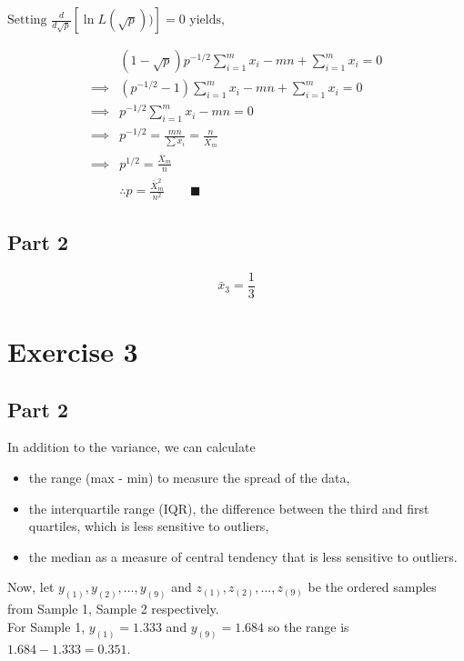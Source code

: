 \documentclass{article}
\begin{document}
$\text{Setting } \frac{d}{d\sqrt{ p }}[\ln{L(\sqrt{ p })})]  = 0 \text{ yields,}$

$$
\begin{aligned}
&(1-\sqrt{ p })p^{-1/2} \sum_{i=1}^m x_{i} - mn + \sum_{i=1}^m x_{i} = 0 \\
\implies &(p^{-1/2} - 1) \sum_{i=1}^m x_{i} - mn + \sum_{i=1}^m x_{i} = 0 \\
\implies &p^{-1/2} \sum_{i=1}^m x_{i} - mn = 0 \\
\implies &p^{-1/2} = \frac{mn}{\sum x_{i}} = \frac{n}{\bar{X}_{m}} \\
\implies &p^{1/2} = \frac{\bar{X}_{m}}{n} \\
& \therefore p = \frac{\bar{X}_{m}^2}{n^2} \qquad \blacksquare
\end{aligned}
$$

\subsection*{Part 2}
$$
\bar{x}_{3} = \frac{1}{3} 
$$

\newpage
\section*{Exercise 3}

\subsection*{Part 2}

In addition to the variance, we can calculate
\begin{itemize}
    \item the range (max - min) to measure the spread of the data,
    \item the interquartile range (IQR), the difference between the third and first quartiles, which is less sensitive to outliers,
    \item the median as a measure of central tendency that is less sensitive to outliers.
\end{itemize}

Now, let $y_{(1)}, y_{(2)}, \dots, y_{(9)}$ and $z_{(1)}, z_{(2)}, \dots, z_{(9)}$ be the ordered samples from Sample 1, Sample 2 respectively. \\

For Sample 1, $y_{(1)} = 1.333$ and $y_{(9)} = 1.684$ so the range is $1.684 - 1.333 = 0.351$.  \\ 
\end{document}
